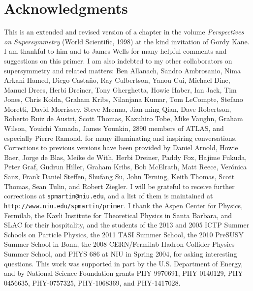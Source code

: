 \documentclass[12pt]{article}
\begin{document}
\section*{Acknowledgments} This is an extended and revised version 
of a chapter in the volume {\it Perspectives on Supersymmetry} 
(World Scientific, 1998) at the kind invitation of Gordy Kane. I am 
thankful to him and to James Wells for many helpful comments and 
suggestions on this primer. I am also indebted to my other collaborators 
on supersymmetry and related matters:
Ben Allanach,
Sandro Ambrosanio,
Nima Arkani-Hamed,
Diego Casta\~no,
Ray Culbertson,
Yanou Cui,
Michael Dine,
Manuel Drees,
Herbi Dreiner,
Tony Gherghetta,
Howie Haber,
Ian Jack, 
Tim Jones,
Chris Kolda,
Graham Kribs,
Nilanjana Kumar,
Tom LeCompte,
Stefano Moretti,
David Morrissey,
Steve Mrenna,
Jian-ming Qian,
Dave Robertson,
Roberto Ruiz de Austri,
Scott Thomas,
Kazuhiro Tobe,
Mike Vaughn, 
Graham Wilson,
Youichi Yamada,
James Younkin,
2890 members of ATLAS,
and especially Pierre Ramond, for many illuminating and inspiring 
conversations. 
Corrections to 
previous versions have been provided by
Daniel Arnold,
Howie Baer,
Jorge de Blas,
Meike de With,
Herbi Dreiner,
Paddy Fox,
Hajime Fukuda,
Peter Graf,
Gudrun Hiller, 
Graham Kribs, 
Bob McElrath,
Matt Reece,
Ver\'onica Sanz,
Frank Daniel Steffen,
Shufang Su, 
John Terning, 
Keith Thomas, 
Scott Thomas, 
Sean Tulin,
and
Robert Ziegler. 
I will be grateful to receive further corrections at 
{\tt spmartin@niu.edu}, and a list of them is maintained at 
{\tt http://www.niu.edu/spmartin/primer}.
I thank the Aspen Center for Physics, Fermilab, the Kavli Institute 
for Theoretical Physics in Santa Barbara, and SLAC for their hospitality, 
and the students of 
the 2013 and 2005 ICTP Summer Schools on Particle Physics,
the 2011 TASI Summer School,
the 2010 PreSUSY Summer School in Bonn,
the 2008 CERN/Fermilab Hadron Collider Physics Summer School,
and PHYS 686 at NIU in Spring 2004,
for asking interesting questions. This work was supported in part by the U.S. 
Department of Energy, and by National Science Foundation 
grants PHY-9970691, PHY-0140129, PHY-0456635, PHY-0757325, PHY-1068369,
and PHY-1417028.


\end{document}
